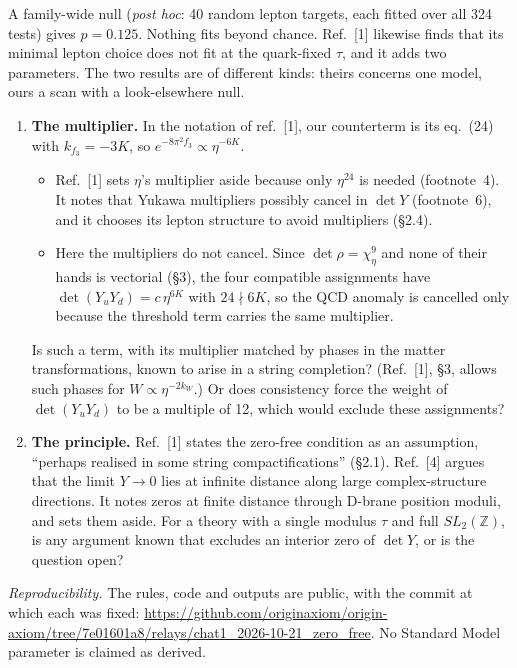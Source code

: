 \documentclass[10pt,a4paper]{article}
\makeatletter
\renewcommand\section{\@startsection{section}{1}{\z@}{-1.3ex plus -0.4ex}{0.4ex}{\normalfont\bfseries}}
\makeatother
\begin{document}
A family-wide null (\emph{post hoc}: 40 random lepton targets, each fitted over all 324 tests) gives $p=0.125$.
Nothing fits beyond chance. Ref.~[1] likewise finds that its minimal lepton choice does not fit at the quark-fixed
$\tau$, and it adds two parameters. The two results are of different kinds: theirs concerns one model, ours a scan
with a look-elsewhere null.

\section{Two questions}
\begin{enumerate}\setlength\itemsep{2pt}
\item \textbf{The multiplier.} In the notation of ref.~[1], our counterterm is its eq.~(24) with $k_{f_3}=-3K$, so
$e^{-8\pi^2f_3}\propto\eta^{-6K}$.
\begin{itemize}\setlength\itemsep{0pt}
\item Ref.~[1] sets $\eta$'s multiplier aside because only $\eta^{24}$ is needed (footnote~4). It notes that Yukawa
multipliers possibly cancel in $\det Y$ (footnote~6), and it chooses its lepton structure to avoid multipliers (\S2.4).
\item Here the multipliers do not cancel. Since $\det\rho=\chi_\eta^9$ and none of their hands is vectorial (\S3), the
four compatible assignments have
$\det(Y_uY_d)=c\,\eta^{6K}$ with $24\nmid6K$, so the QCD anomaly is cancelled only because the threshold term
carries the same multiplier.
\end{itemize}
Is such a term, with its multiplier matched by phases in the matter transformations, known to arise in a string
completion? (Ref.~[1], \S3, allows such phases for $W\propto\eta^{-2k_W}$.) Or does consistency force the weight of
$\det(Y_uY_d)$ to be a multiple of 12, which would exclude these assignments?
\item \textbf{The principle.} Ref.~[1] states the zero-free condition as an assumption, ``perhaps realised in some
string compactifications'' (\S2.1). Ref.~[4] argues that the limit $Y\to0$ lies at infinite distance along large
complex-structure directions. It notes zeros at finite distance through D-brane position moduli, and sets them aside.
For a theory with a single modulus $\tau$ and full $SL_2(\mathbb Z)$, is any argument known that excludes an
interior zero of $\det Y$, or is the question open?
\end{enumerate}

\textit{Reproducibility.} The rules, code and outputs are public, with the commit at which each was fixed:
\url{https://github.com/originaxiom/origin-axiom/tree/7e01601a8/relays/chat1_2026-10-21_zero_free}. No Standard Model
parameter is claimed as derived.
\end{document}
